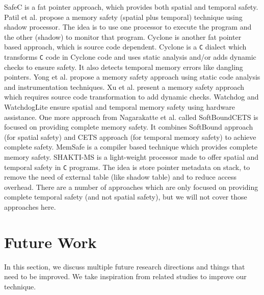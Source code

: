 SafeC \citep{austin1994efficient} is a fat pointer approach, which provides both spatial and temporal safety. Patil et al. \cite{patil1995efficient} propose a memory safety (spatial plus temporal) technique using shadow processor. The idea is to use one processor to execute the program and the other (shadow) to monitor that program. Cyclone \citep{Jim:2002:CSD:647057.713871} is another fat pointer based approach, which is source code dependent. Cyclone is a \texttt{C} dialect which transforms \texttt{C} code in Cyclone code and uses static analysis and/or adds dynamic checks to ensure safety. It also detects temporal memory errors like dangling pointers. Yong et al. \citep{yong2003protecting} propose a memory safety approach using static code analysis and instrumentation techniques. Xu et al. \citep{xu2004efficient} present a memory safety approach which requires source code transformation to add dynamic checks. Watchdog \citep{nagarakatte2012watchdog} and WatchdogLite \citep{nagarakatte2014watchdoglite} ensure spatial and temporal memory safety using hardware assistance. One more approach from Nagarakatte et al. called SoftBoundCETS \citep{nagarakatte2015everything} is focused on providing complete memory safety. It combines SoftBound approach (for spatial safety) and CETS approach (for temporal memory safety) \citep{nagarakatte2010cets} to achieve complete safety. MemSafe \citep{simpson2013memsafe} is a compiler based technique which provides complete memory safety. SHAKTI-MS \citep{Das:2019:SRP:3316482.3326356} is a light-weight processor made to offer spatial and temporal safety in \texttt{C} programs. The idea is store pointer metadata on stack, to remove the need of external table (like shadow table) and to reduce access overhead. There are a number of approaches which are only focused on providing complete temporal safety (and not spatial safety), but we will not cover those approaches here.

\section{Future Work}
In this section, we discuss multiple future research directions and things that need to be improved. We take inspiration from related studies to improve our technique.

